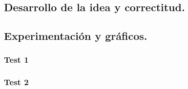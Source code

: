 \subsection{Desarrollo de la idea y correctitud.}

\vspace*{0.3cm}


 
\vspace*{0.6cm}

\subsection{Experimentación y gráficos.}

\vspace*{0.3cm}


\subsubsection{Test 1}
\vspace*{0.3cm}

\vspace*{0.6cm}

\subsubsection{Test 2}


